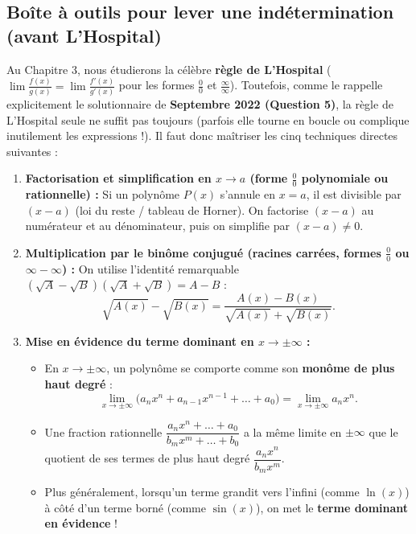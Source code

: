 \subsection{Boîte à outils pour lever une indétermination (avant L'Hospital)}

Au Chapitre 3, nous étudierons la célèbre \textbf{règle de L'Hospital} ($\lim \frac{f(x)}{g(x)} = \lim \frac{f'(x)}{g'(x)}$ pour les formes $\frac{0}{0}$ et $\frac{\infty}{\infty}$). Toutefois, comme le rappelle explicitement le solutionnaire de \textbf{Septembre 2022 (Question 5)}, la règle de L'Hospital seule ne suffit pas toujours (parfois elle tourne en boucle ou complique inutilement les expressions !). Il faut donc maîtriser les cinq techniques directes suivantes :

\begin{theoreme}
\begin{enumerate}
    \item \textbf{Factorisation et simplification en $x \to a$ (forme $\frac{0}{0}$ polynomiale ou rationnelle) :} Si un polynôme $P(x)$ s'annule en $x = a$, il est divisible par $(x - a)$ (loi du reste / tableau de Horner). On factorise $(x-a)$ au numérateur et au dénominateur, puis on simplifie par $(x-a) \neq 0$.
    \item \textbf{Multiplication par le binôme conjugué (racines carrées, formes $\frac{0}{0}$ ou $\infty - \infty$) :} On utilise l'identité remarquable $(\sqrt{A} - \sqrt{B})(\sqrt{A} + \sqrt{B}) = A - B$ :
    \[
        \sqrt{A(x)} - \sqrt{B(x)} = \frac{A(x) - B(x)}{\sqrt{A(x)} + \sqrt{B(x)}}.
    \]
    \item \textbf{Mise en évidence du terme dominant en $x \to \pm\infty$ :}
    \begin{itemize}
        \item En $x \to \pm\infty$, un polynôme se comporte comme son \textbf{monôme de plus haut degré} :
        \[
            \lim_{x \to \pm\infty} \bigl(a_n x^n + a_{n-1}x^{n-1} + \dots + a_0\bigr) = \lim_{x \to \pm\infty} a_n x^n.
        \]
        \item Une fraction rationnelle $\dfrac{a_n x^n + \dots + a_0}{b_m x^m + \dots + b_0}$ a la même limite en $\pm\infty$ que le quotient de ses termes de plus haut degré $\dfrac{a_n x^n}{b_m x^m}$.
        \item Plus généralement, lorsqu'un terme grandit vers l'infini (comme $\ln(x)$) à côté d'un terme borné (comme $\sin(x)$), on met le \textbf{terme dominant en évidence} !
    \end{itemize}

\end{enumerate}
\end{theoreme}

